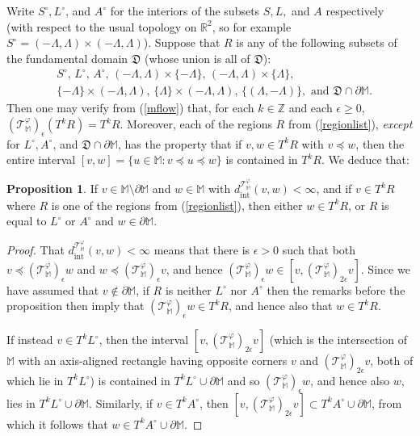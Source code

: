 \documentclass[11pt]{amsart}
\theoremstyle{definition}
\newtheorem{prop}[theorem]{Proposition}
\theoremstyle{remark}
\numberwithin{equation}{section}
\def\ep{\epsilon}
\def\R{\mathbb{R}}
\def\Z{\mathbb{Z}}
\begin{document}
Write $S^{\circ},L^{\circ}$, and $A^{\circ}$ for the interiors of the subsets $S,L,$ and $A$ respectively (with respect to the usual topology on $\R^2$, so for example $S^{\circ}=(-\Lambda,\Lambda)\times(-\Lambda,\Lambda)$).  Suppose that $R$ is any of the following subsets of the fundamental domain $\mathfrak{D}$ (whose union is all of $\mathfrak{D}$): \begin{align} \label{regionlist}\nonumber & S^{\circ},\,L^{\circ},\, A^{\circ},\,(-\Lambda,\Lambda)\times\{-\Lambda\},\,(-\Lambda,\Lambda)\times\{\Lambda\},\\ & \{-\Lambda\}\times (-\Lambda,\Lambda),\,\{\Lambda\}\times (-\Lambda,\Lambda),\,\{(\Lambda,-\Lambda)\},\mbox{ and } \mathfrak{D}\cap \partial\mathbb{M}.\end{align}  Then one may verify from (\ref{mflow}) that, for each $k\in\Z$ and each $\ep\geq 0$, $(\mathcal{T}_{\mathbb{M}}^{\varphi})_{\ep}(T^kR)=T^kR$. Moreover, each of the regions $R$ from (\ref{regionlist}), \emph{except} for $L^{\circ},A^{\circ}$, and $\mathfrak{D}\cap \partial\mathbb{M}$, has the property that if $v,w\in T^kR$ with $v\preceq w$, then the entire interval $[v,w]=\{u\in\mathbb{M}:v\preceq u\preceq w\}$ is contained in $T^kR$.   We deduce that:

\begin{prop}\label{sepregions} If $v\in \mathbb{M}\setminus\partial\mathbb{M}$ and $w\in\mathbb{M}$ with
	 $d_{\mathrm{int}}^{\mathcal{T}_{\mathbb{M}}^{\varphi}}(v,w)<\infty$, 
	 and if $v\in T^kR$ where $R$ is one of the regions from (\ref{regionlist}), then either $w\in T^kR$, or $R$ is equal to $L^{\circ}$ or $A^{\circ}$ and $w\in\partial\mathbb{M}$.
\end{prop}

\begin{proof}
	That $d^{\mathcal{T}_{\mathbb{M}}^{\varphi}}_{\mathrm{int}}(v,w)<\infty$ means that there is $\ep>0$ such that both $v\preceq (\mathcal{T}_{\mathbb{M}}^{\varphi})_{\ep}w$ and $w\preceq (\mathcal{T}_{\mathbb{M}}^{\varphi})_{\ep}v$, and hence $ (\mathcal{T}_{\mathbb{M}}^{\varphi})_{\ep}w\in [v,(\mathcal{T}_{\mathbb{M}}^{\varphi})_{2\ep}v ]$.  Since we have assumed that $v\notin\partial\mathbb{M}$, if $R$ is neither $L^{\circ}$ nor $A^{\circ}$ then the remarks before the proposition then imply that  $ (\mathcal{T}_{\mathbb{M}}^{\varphi})_{\ep}w\in T^k R$, and hence also that $w\in T^k R$.  
	
	If instead $v\in T^kL^{\circ}$, then the interval $[v,(\mathcal{T}_{\mathbb{M}}^{\varphi})_{2\ep}v ]$ (which is the intersection of $\mathbb{M}$ with an axis-aligned rectangle having opposite corners $v$ and $(\mathcal{T}_{\mathbb{M}}^{\varphi})_{2\ep}v$, both of which lie in $T^kL^{\circ}$) is contained in $T^kL^{\circ}\cup \partial\mathbb{M}$ and so $(\mathcal{T}_{\mathbb{M}}^{\varphi})_{\ep}w$, and hence also $w$, lies in $T^kL^{\circ}\cup\partial\mathbb{M}$. Similarly, if $v\in T^k A^{\circ}$, then $[v,(\mathcal{T}_{\mathbb{M}}^{\varphi})_{2\ep}v ]\subset T^kA^{\circ}\cup\partial\mathbb{M}$, from which it follows that $w\in T^kA^{\circ}\cup\partial\mathbb{M}$. 
\end{proof}
\end{document}
